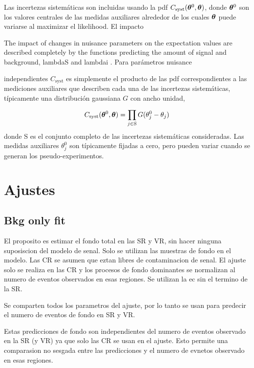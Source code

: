 Las incertezas sistemáticas son incluidas usando la pdf
$C_\text{syst}(\bm{\theta}^0, \bm{\theta})$, donde $\bm{\theta}^0$ son los valores centrales
de las medidas auxiliares alrededor de los cuales $\bm{\theta}$ puede variarse al
maximizar el likelihood.
El impacto

The impact of changes in nuisance parameters on the expectation values are
described completely by the functions predicting the amount of signal and background,
lambdaS and lambdai . Para parámetros nuisance


independientes $C_\text{syst}$ es simplemente el producto de las pdf
correspondientes a las mediciones auxiliares que describen cada una de las
incertezas sistemáticas, típicamente una distribución gaussiana $G$ con ancho
unidad,

\begin{equation}
  C_\text{syst} (\bm{\theta}^0, \bm{\theta}) = \prod_{j \in \text{S}} G(\theta_j^0 -
  \theta_j)
\end{equation}
%
donde S es el conjunto completo de las incertezas sistemáticas consideradas. Las
medidas auxiliares $\theta^0_j$ son típicamente fijadas a cero, pero pueden
variar cuando se generan los pseudo-experimentos.


\section{Ajustes}


\subsection{Bkg only fit}

El proposito  es estimar el fondo total en las SR y VR, sin hacer ninguna suposiscion del
modelo de senal. Solo se utilizan las muestras de fondo en el modelo. Las CR se asumen que eztan libres
de contaminacion de senal.  El ajuste solo se realiza en las CR y los procesos de fondo
dominantes se normalizan al numero de eventos observados en esas regiones.
Se utilizan la ec sin el termino de la SR.

Se comparten todos los parametros del ajuste, por lo tanto se usan para predecir
el numero de eventos de fondo en SR y VR.

Estas predicciones de fondo son independientes del numero de eventos observado en la SR (y VR)
ya que solo las CR se usan en el ajuste. Esto permite una comparasion no sesgada entre las
predicciones y el numero de evnetos observado en esas regiones.






